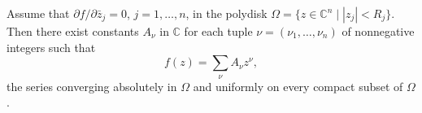 
Assume that $\partial f / \partial \bar{z}_j = 0$, $j = 1, \ldots, n$, in the polydisk $\Omega = \{z \in \mathbb{C}^n \mid |z_j| < R_j\}$. Then there exist constants $A_\nu$ in $\mathbb{C}$ for each tuple $\nu = (\nu_1, \ldots, \nu_n)$ of nonnegative integers such that
$$f(z) = \sum_{\nu} A_\nu z^\nu,$$
the series converging absolutely in $\Omega$ and uniformly on every compact subset of $\Omega$.

